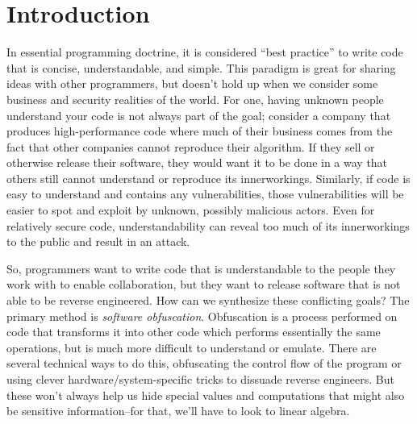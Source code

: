 \section{Introduction}
In essential programming doctrine, it is considered ``best practice'' to write code that
is concise, understandable, and simple. This paradigm is great for sharing ideas
with other programmers, but doesn't hold up when we consider some business and 
security realities of the world. For one, having unknown people understand
your code is not always part of the goal; consider a company that produces 
high-performance code where much of their business comes from the fact that 
other companies cannot reproduce their algorithm. If they sell or otherwise
release their software, they would want it to be done in a way that others still
cannot understand or reproduce its innerworkings.
Similarly, if code is easy to understand and contains any vulnerabilities, 
those vulnerabilities will be easier to spot and exploit by unknown, possibly
malicious actors. Even for relatively secure code, understandability can reveal
too much of its innerworkings to the public and result in an attack.
\par So, programmers want to write code that is understandable to the people 
they work with to enable collaboration, but they want to release software that is not
able to be reverse engineered. How can we synthesize 
these conflicting goals? The primary method is {\itshape software obfuscation}.
Obfuscation is a process performed on code that transforms it into other code
which performs essentially the same operations, but is much more difficult to 
understand or emulate. There are several technical ways to do this, obfuscating
the control flow of the program or using clever hardware/system-specific tricks
to dissuade reverse engineers. But these won't always help us hide special values
and computations that might also be sensitive information--for that, we'll have to 
look to linear algebra.
